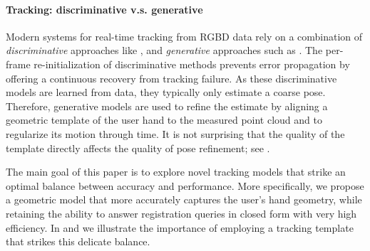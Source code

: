 \paragraph{Tracking: discriminative v.s. generative}
Modern systems for real-time tracking from RGBD data  \cite{sridhar2015fast,sharp2015accurate} rely on a combination of \emph{discriminative} approaches like \cite{keskin2012hand}, and \emph{generative} approaches such as \cite{oiko2011hand}. The per-frame re-initialization of discriminative methods prevents error propagation by offering a continuous recovery from tracking failure. As these discriminative models are learned from data, they typically only estimate a coarse pose. Therefore, generative models are used to refine the estimate by aligning a geometric template of the user hand to the measured point cloud and to regularize its motion through time. It is not surprising that the quality of the template directly affects the quality of pose refinement; see . 

The main goal of this paper is to explore novel tracking models that strike an optimal balance between accuracy and performance.  More specifically, we propose a geometric model that more accurately captures the user's hand geometry, while retaining the ability to answer registration queries in closed form with very high efficiency. In  and  we illustrate the importance of employing a tracking template that strikes this delicate balance.


